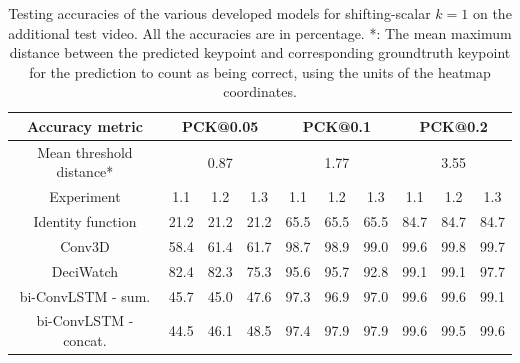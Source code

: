 \documentclass[./main.tex]{subfiles}
\begin{document}
\begin{table}[htbp]
    \begin{tabular}{c||ccc|ccc|ccc}
        \hline
        Accuracy metric & \multicolumn{3}{c}{PCK@0.05} & \multicolumn{3}{c}{PCK@0.1} & \multicolumn{3}{c}{PCK@0.2} \\
        \hline
        Mean threshold distance* & \multicolumn{3}{c}{0.87} & \multicolumn{3}{c}{1.77} & \multicolumn{3}{c}{3.55} \\
        \hline
        Experiment & 1.1 & 1.2 & 1.3 & 1.1 & 1.2 & 1.3 & 1.1 & 1.2 & 1.3 \\
        \hline
        \hline
        Identity function & 21.2 & 21.2 & 21.2 & 65.5 & 65.5 & 65.5 & 84.7 & 84.7 & 84.7 \\
        Conv3D & 58.4 & 61.4 & 61.7 & 98.7 & 98.9 & 99.0 & 99.6 & 99.8 & 99.7 \\
        DeciWatch & 82.4 & 82.3 & 75.3 & 95.6 & 95.7 & 92.8 & 99.1 & 99.1 & 97.7 \\
        bi-ConvLSTM - sum. & 45.7 & 45.0 & 47.6 & 97.3 & 96.9 & 97.0 & 99.6 & 99.6 & 99.1 \\
        bi-ConvLSTM - concat. & 44.5 & 46.1 & 48.5 & 97.4 & 97.9 & 97.9 & 99.6 & 99.5 & 99.6 \\
        \hline
    \end{tabular}
    \caption{Testing accuracies of the various developed models for shifting-scalar $k = 1$ on the additional test video. All the accuracies are in percentage. *: The mean maximum distance between the predicted keypoint and corresponding groundtruth keypoint for the prediction to count as being correct, using the units of the heatmap coordinates.}
    \label{tab:finetune_test_accs_3}
\end{table}
\end{document}

